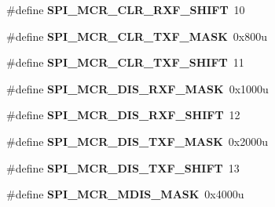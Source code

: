 \begin{DoxyCompactItemize}
\item 
\hypertarget{group___s_p_i___register___masks_gae1f4b01eb27f199a893e42f6a3d3edb7}{}\#define {\bfseries S\+P\+I\+\_\+\+M\+C\+R\+\_\+\+C\+L\+R\+\_\+\+R\+X\+F\+\_\+\+S\+H\+I\+F\+T}~10\label{group___s_p_i___register___masks_gae1f4b01eb27f199a893e42f6a3d3edb7}

\item 
\hypertarget{group___s_p_i___register___masks_ga5b57559246a1a4c32c53542e9f0ea2cb}{}\#define {\bfseries S\+P\+I\+\_\+\+M\+C\+R\+\_\+\+C\+L\+R\+\_\+\+T\+X\+F\+\_\+\+M\+A\+S\+K}~0x800u\label{group___s_p_i___register___masks_ga5b57559246a1a4c32c53542e9f0ea2cb}

\item 
\hypertarget{group___s_p_i___register___masks_ga0f0a133d00c115835f0b50c334c104cf}{}\#define {\bfseries S\+P\+I\+\_\+\+M\+C\+R\+\_\+\+C\+L\+R\+\_\+\+T\+X\+F\+\_\+\+S\+H\+I\+F\+T}~11\label{group___s_p_i___register___masks_ga0f0a133d00c115835f0b50c334c104cf}

\item 
\hypertarget{group___s_p_i___register___masks_ga27dfc23fb0551340c07676e7092267d4}{}\#define {\bfseries S\+P\+I\+\_\+\+M\+C\+R\+\_\+\+D\+I\+S\+\_\+\+R\+X\+F\+\_\+\+M\+A\+S\+K}~0x1000u\label{group___s_p_i___register___masks_ga27dfc23fb0551340c07676e7092267d4}

\item 
\hypertarget{group___s_p_i___register___masks_gaea17770537c6e387ed266e662f5e9d49}{}\#define {\bfseries S\+P\+I\+\_\+\+M\+C\+R\+\_\+\+D\+I\+S\+\_\+\+R\+X\+F\+\_\+\+S\+H\+I\+F\+T}~12\label{group___s_p_i___register___masks_gaea17770537c6e387ed266e662f5e9d49}

\item 
\hypertarget{group___s_p_i___register___masks_gaa8bb3e6a285a70d51f3e637c2a29a41e}{}\#define {\bfseries S\+P\+I\+\_\+\+M\+C\+R\+\_\+\+D\+I\+S\+\_\+\+T\+X\+F\+\_\+\+M\+A\+S\+K}~0x2000u\label{group___s_p_i___register___masks_gaa8bb3e6a285a70d51f3e637c2a29a41e}

\item 
\hypertarget{group___s_p_i___register___masks_ga66fb6e165076aac7d60e416ed0950067}{}\#define {\bfseries S\+P\+I\+\_\+\+M\+C\+R\+\_\+\+D\+I\+S\+\_\+\+T\+X\+F\+\_\+\+S\+H\+I\+F\+T}~13\label{group___s_p_i___register___masks_ga66fb6e165076aac7d60e416ed0950067}

\item 
\hypertarget{group___s_p_i___register___masks_gad6230b186a0f86d3b06973a0abad85d3}{}\#define {\bfseries S\+P\+I\+\_\+\+M\+C\+R\+\_\+\+M\+D\+I\+S\+\_\+\+M\+A\+S\+K}~0x4000u\label{group___s_p_i___register___masks_gad6230b186a0f86d3b06973a0abad85d3}


\end{DoxyCompactItemize}
